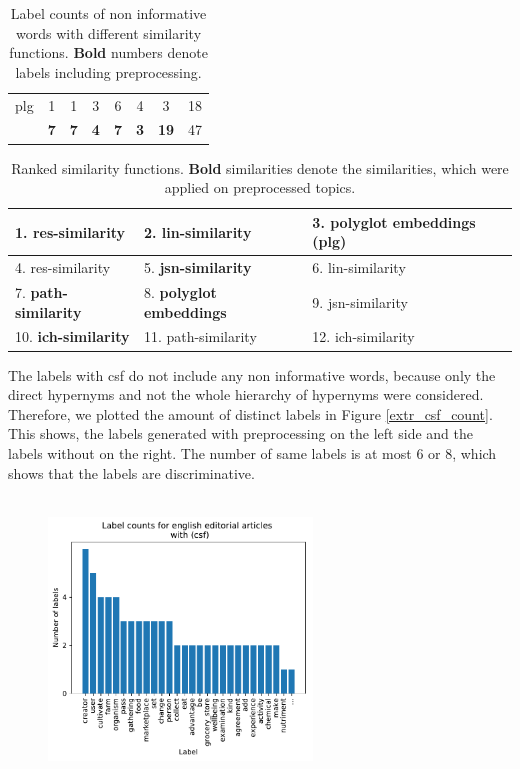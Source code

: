 {\begin{table}[h]
\begin{tabular}{c|c|c|c|c|c|c|c}
		\hline
		plg& 1		&1		 &3	   &6      &4       &3 &18\\
		& \textbf{7}&\textbf{7}	 &\textbf{4}  &\textbf{7} &\textbf{3} &\textbf{19} & 47\\
	\end{tabular}
	\caption[Label counts of non informative words]{Label counts of non informative words with different similarity functions. \textbf{Bold} numbers denote labels including preprocessing.}
	\label{tab:label_count_non_informative}
\end{table}
\begin{table}[h]
	\begin{tabular}{|l|l|l|}
		\hline
		1. \textbf{res-similarity} &2. \textbf{lin-similarity} &
		3. polyglot embeddings (plg) \\ 
		\hline
		4. res-similarity&5. \textbf{jsn-similarity}& 6. lin-similarity\\
		\hline
		7. \textbf{path-similarity} &8. \textbf{polyglot embeddings} &9. jsn-similarity \\ 
		\hline
		10. \textbf{ich-similarity}&11. path-similarity  &12. ich-similarity\\
		\hline
	\end{tabular}
\caption[Ranked similarity functions for extrinsic labeling]{Ranked similarity functions. \textbf{Bold} similarities denote the similarities, which were applied on preprocessed topics.}
\label{tab:ranked_non_info}
\end{table}
The labels with \ac{csf} do not include any non informative words, because only the direct hypernyms and not the whole hierarchy of hypernyms were considered. Therefore, we plotted the amount of distinct labels in Figure \ref{extr_csf_count}. This shows, the labels generated with preprocessing on the left side and the labels without on the right. The number of same labels is at most 6 or 8, which shows that the labels are discriminative.
\begin{figure}
	\begin{minipage}{0.5\textwidth}
		\includegraphics[width=7cm,height=7.5cm]{gfx/ATL_sim/with_scoring_pre.pdf}

\end{minipage}
\end{figure}}
